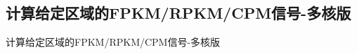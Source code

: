 \subsection{计算给定区域的FPKM/RPKM/CPM信号-多核版}

\begin{frame}[standout] 计算给定区域的FPKM/RPKM/CPM信号-多核版 \end{frame}


